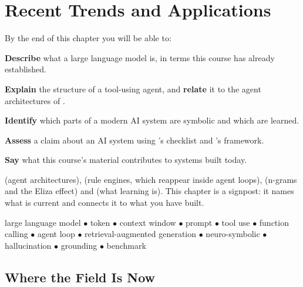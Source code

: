 \chapter{Recent Trends and Applications}\label{ch:trends}

\begin{outcomes}
By the end of this chapter you will be able to:
\begin{tight}
  \item \textbf{Describe} what a large language model is, in terms this course has
        already established.
  \item \textbf{Explain} the structure of a tool-using agent, and \textbf{relate}
        it to the agent architectures of .
  \item \textbf{Identify} which parts of a modern AI system are symbolic and which
        are learned.
  \item \textbf{Assess} a claim about an AI system using 's
        checklist and 's framework.
  \item \textbf{Say} what this course's material contributes to systems built
        today.
\end{tight}
\end{outcomes}

\begin{prereq}
 (agent architectures),  (rule engines, which reappear
inside agent loops),  (n-grams and the Eliza effect) and
 (what learning is). This chapter is a signpost: it names what is
current and connects it to what you have built.
\end{prereq}

\begin{keyterms}
large language model $\bullet$ token $\bullet$ context window $\bullet$ prompt
$\bullet$ tool use $\bullet$ function calling $\bullet$ agent loop $\bullet$
retrieval-augmented generation $\bullet$ neuro-symbolic $\bullet$ hallucination
$\bullet$ grounding $\bullet$ benchmark
\end{keyterms}

\section{Where the Field Is Now}

